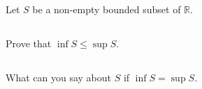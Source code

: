 \documentclass[11pt,letterpaper]{article}
\begin{document}





\section{}
Let $S$ be a non-empty bounded subset of $\mathbb{R}$.
\subsection{} Prove that $\inf S\leq \sup S$.
\subsection{} What can you say about $S$ if $\inf S= \sup S$.
\end{document}
